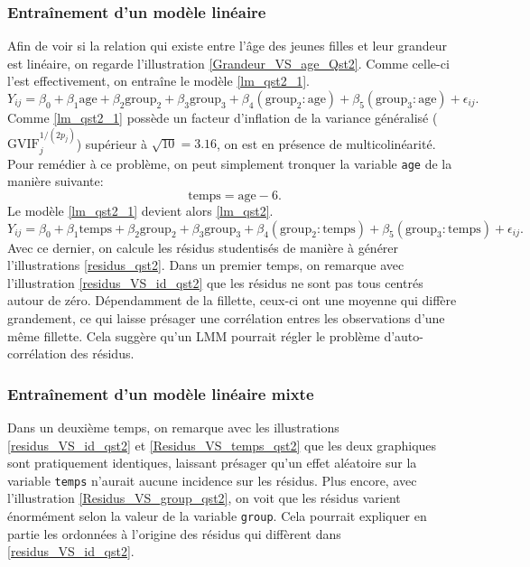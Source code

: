 \documentclass{article}
\begin{document}
	\subsubsection*{Entraînement d'un modèle linéaire}
		Afin de voir si la relation qui existe entre l'âge des jeunes filles et leur grandeur est linéaire, on regarde l'illustration \ref{Grandeur_VS_age_Qst2}. Comme celle-ci l'est effectivement, on entraîne le modèle \eqref{lm_qst2_1}.
		\begin{equation}\label{lm_qst2_1}
			Y_{ij} = \beta_0 + \beta_1 \mathrm{age} + \beta_2 \mathrm{group_2} + \beta_3 \mathrm{group_3} + \beta_4 (\mathrm{group_2:age}) + \beta_5 (\mathrm{group_3:age}) + \epsilon_{ij}.
		\end{equation}
		Comme \eqref{lm_qst2_1} possède un facteur d'inflation de la variance généralisé ($\mathrm{GVIF}_j^{1/(2p_j)}$) supérieur à $\sqrt{10} = 3.16$, on est en présence de multicolinéarité. Pour remédier à ce problème, on peut simplement tronquer la variable \texttt{age} de la manière suivante:
		$$\mathrm{temps}=\mathrm{age}-6.$$
		Le modèle \eqref{lm_qst2_1} devient alors \eqref{lm_qst2}.
		\begin{equation}\label{lm_qst2}
			Y_{ij} = \beta_0 + \beta_1 \mathrm{temps} + \beta_2 \mathrm{group_2} + \beta_3 \mathrm{group_3} + \beta_4 (\mathrm{group_2:temps}) + \beta_5 (\mathrm{group_3:temps}) + \epsilon_{ij}.
		\end{equation}
		Avec ce dernier, on calcule les résidus studentisés de manière à générer l'illustrations \ref{residus_qst2}. Dans un premier temps, on remarque avec l'illustration \ref{residus_VS_id_qst2} que les résidus ne sont pas tous centrés autour de zéro. Dépendamment de la fillette, ceux-ci ont une moyenne qui diffère grandement, ce qui laisse présager une corrélation entres les observations d'une même fillette. Cela suggère qu'un LMM pourrait régler le problème d'auto-corrélation des résidus.
		
		\subsubsection*{Entraînement d'un modèle linéaire mixte}
		Dans un deuxième temps, on remarque avec les illustrations \ref{residus_VS_id_qst2} et \ref{Residus_VS_temps_qst2} que les deux graphiques sont pratiquement identiques, laissant présager qu'un effet aléatoire sur la variable \texttt{temps} n'aurait aucune incidence sur les résidus. Plus encore, avec l'illustration \ref{Residus_VS_group_qst2}, on voit que les résidus varient énormément selon la valeur de la variable \texttt{group}. Cela pourrait expliquer en partie les ordonnées à l'origine des résidus qui diffèrent dans \ref{residus_VS_id_qst2}.\\		
	
\end{document}
